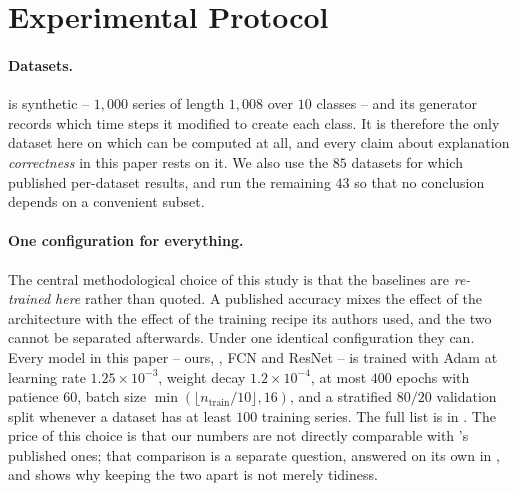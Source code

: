 %

\section{Experimental Protocol}
\label{sec:protocol}

\paragraph{Datasets.}
\webtraffic{} \citep{early2024millet} is synthetic -- $1{,}000$ series of length $1{,}008$ over $10$
classes -- and its generator records which time steps it modified to create each class. It is
therefore the only dataset here on which \ndcg{} can be computed at all, and every claim about
explanation \emph{correctness} in this paper rests on it. We also use the $85$ \ucr{} datasets
\citep{dau2019ucr} for which \millet{} published per-dataset results, and run the remaining $43$ so
that no conclusion depends on a convenient subset.

\paragraph{One configuration for everything.}
The central methodological choice of this study is that the baselines are \emph{re-trained here}
rather than quoted. A published accuracy mixes the effect of the architecture with the effect of the
training recipe its authors used, and the two cannot be separated afterwards. Under one identical
configuration they can. Every model in this paper -- ours, \millet{}, FCN and ResNet
\citep{wang2017fcn} -- is trained with Adam \citep{kingma2015adam} at learning rate
$1.25\times10^{-3}$, weight decay $1.2\times10^{-4}$, at most $400$ epochs with patience $60$, batch
size $\min(\lfloor n_{\mathrm{train}}/10\rfloor, 16)$, and a stratified $80/20$ validation split
whenever a dataset has at least $100$ training series. The full list is in . The
price of this choice is that our numbers are not directly comparable with \millet{}'s published
ones; that comparison is a separate question, answered on its own in , and
 shows why keeping the two apart is not merely tidiness.

